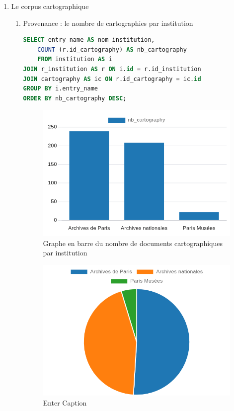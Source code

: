 \begin{enumerate}
\newpage
    \item Le corpus cartographique
    \begin{enumerate}
        \item Provenance : le nombre de cartographies par institution
            \begin{lstlisting}[language=SQL, caption=Nombre de cartographie par institution]
SELECT entry_name AS nom_institution,
    COUNT (r.id_cartography) AS nb_cartography 
    FROM institution AS i 
JOIN r_institution AS r ON i.id = r.id_institution 
JOIN cartography AS ic ON r.id_cartography = ic.id 
GROUP BY i.entry_name 
ORDER BY nb_cartography DESC;\end{lstlisting}
\begin{figure}[ht!]
    \centering
    \includegraphics[width=0.5\linewidth]{images/graphiques/nb_carto_institution_barChart.png}
    \caption{Graphe en barre du nombre de documents cartographiques par institution}
    \label{fig:nb_carto_institution_bar}
\end{figure}

\begin{figure}[ht!]
    \centering
    \includegraphics[width=0.5\linewidth]{images/graphiques/nb_carto_institution_pie.png}
    \caption{Enter Caption}
    \label{fig:nb_carto_institution_pie}
\end{figure}


\end{enumerate}
\end{enumerate}
